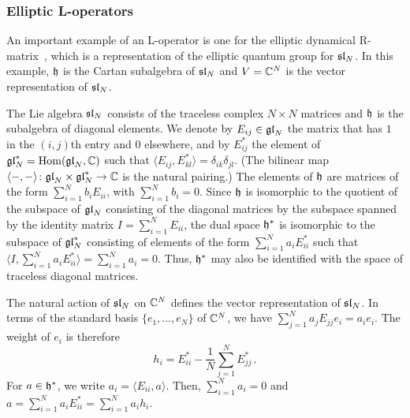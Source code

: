 \subsubsection{Elliptic L-operators}

An important example of an L-operator is one for the elliptic
dynamical R-matrix~\cite{Baxter:1972wf, MR908997, Jimbo:1987mu}, which
is a representation of the elliptic quantum group for $\mathfrak{sl}_N$.  In
this example, $\mathfrak{h}$ is the Cartan subalgebra of $\mathfrak{sl}_N$ and
$V = \mathbb{C}^N$ is the vector representation of $\mathfrak{sl}_N$.

The Lie algebra $\mathfrak{sl}_N$ consists of the traceless complex
$N \times N$ matrices and $\mathfrak{h}$ is the subalgebra of diagonal
elements.  We denote by $E_{ij} \in \mathfrak{gl}_N$ the matrix that has $1$ in
the $(i,j)$th entry and $0$ elsewhere, and by $E^*_{ij}$ the element
of $\mathfrak{gl}_N^* = \mathop{\mathrm{Hom}}\nolimits(\mathfrak{gl}_N, \mathbb{C})$ such that
$\langle E_{ij}, E_{kl}^*\rangle = \delta_{ik} \delta_{jl}$.  (The
bilinear map $\langle-,-\rangle\colon \mathfrak{gl}_N \times \mathfrak{gl}_N^* \to \mathbb{C}$
is the natural pairing.)  The elements of $\mathfrak{h}$ are matrices of the
form $\sum_{i=1}^N b_i E_{ii}$, with $\sum_{i=1}^N b_i = 0$.  Since
$\mathfrak{h}$ is isomorphic to the quotient of the subspace of $\mathfrak{gl}_N$
consisting of the diagonal matrices by the subspace spanned by the
identity matrix $I = \sum_{i=1}^N E_{ii}$, the dual space $\mathfrak{h}^*$ is
isomorphic to the subspace of $\mathfrak{gl}_N^*$ consisting of elements of the
form $\sum_{i=1}^N a_i E_{ii}^*$ such that
$\langle I, \sum_{i=1}^N a_i E_{ii}^*\rangle = \sum_{i=1}^N a_i = 0$.
Thus, $\mathfrak{h}^*$ may also be identified with the space of traceless
diagonal matrices.

The natural action of $\mathfrak{sl}_N$ on $\mathbb{C}^N$ defines the vector
representation of $\mathfrak{sl}_N$.  In terms of the standard basis
$\{e_1, \dotsc, e_N\}$ of $\mathbb{C}^N$, we have
$\sum_{j=1}^N a_j E_{jj} e_i = a_i e_i$.  The weight of $e_i$ is
therefore
\begin{equation}
  h_i
  = E_{ii}^* - \frac{1}{N} \sum_{j=1}^N E_{jj}^* \,.
\end{equation}
For $a \in \mathfrak{h}^*$, we write $a_i = \langle E_{ii}, a\rangle$.  Then,
$\sum_{i=1}^N a_i = 0$ and
$a = \sum_{i=1}^N a_i E_{ii}^* = \sum_{i=1}^N a_i h_i$.


